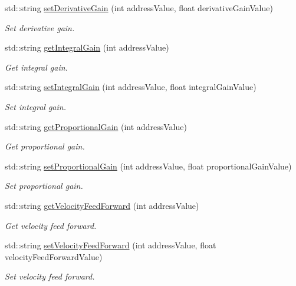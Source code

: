 \begin{DoxyCompactItemize}
std\+::string \hyperlink{namespaceconex_aa25149260c978531ca8f139da8b968b8}{set\+Derivative\+Gain} (int address\+Value, float derivative\+Gain\+Value)
\begin{DoxyCompactList}\small\item\em Set derivative gain. \end{DoxyCompactList}\item 
std\+::string \hyperlink{namespaceconex_ad08578dd23c3b65f2d73405ca35774ad}{get\+Integral\+Gain} (int address\+Value)
\begin{DoxyCompactList}\small\item\em Get integral gain. \end{DoxyCompactList}\item 
std\+::string \hyperlink{namespaceconex_af806b975f4f1ce8ee3e83ce660f72593}{set\+Integral\+Gain} (int address\+Value, float integral\+Gain\+Value)
\begin{DoxyCompactList}\small\item\em Set integral gain. \end{DoxyCompactList}\item 
std\+::string \hyperlink{namespaceconex_a0ed457be041ec821472eb60ef3f7768d}{get\+Proportional\+Gain} (int address\+Value)
\begin{DoxyCompactList}\small\item\em Get proportional gain. \end{DoxyCompactList}\item 
std\+::string \hyperlink{namespaceconex_a852e0fb570af45c7d523f94a2b81b84b}{set\+Proportional\+Gain} (int address\+Value, float proportional\+Gain\+Value)
\begin{DoxyCompactList}\small\item\em Set proportional gain. \end{DoxyCompactList}\item 
std\+::string \hyperlink{namespaceconex_aee916cc8cb9915577fc989826496fe6e}{get\+Velocity\+Feed\+Forward} (int address\+Value)
\begin{DoxyCompactList}\small\item\em Get velocity feed forward. \end{DoxyCompactList}\item 
std\+::string \hyperlink{namespaceconex_a5bcb38c3b971ccf0f2c03794ae16798c}{set\+Velocity\+Feed\+Forward} (int address\+Value, float velocity\+Feed\+Forward\+Value)
\begin{DoxyCompactList}\small\item\em Set velocity feed forward. \end{DoxyCompactList}\item 

\end{DoxyCompactItemize}
